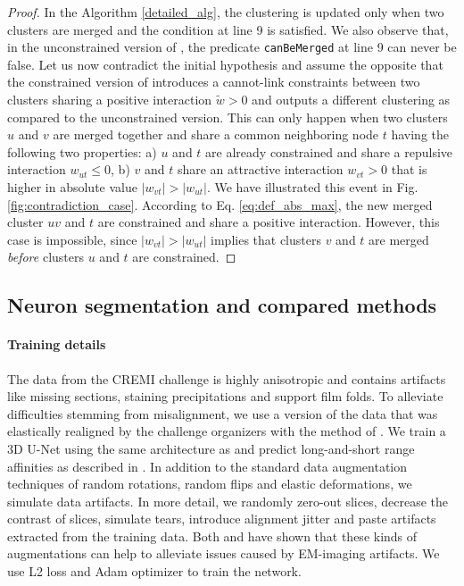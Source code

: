 \begin{proof}
In the \algname{} Algorithm \ref{detailed_alg}, the clustering is updated only when two clusters are merged and the condition at line 9 is satisfied. 
We also observe that, in the unconstrained version of \algname{}, the predicate \texttt{canBeMerged} at line 9 can never be false.
Let us now contradict the initial hypothesis and assume the opposite that the constrained version of \algname{} introduces a cannot-link constraints between two clusters sharing a positive interaction $\tilde{w}>0$ and outputs a different clustering as compared to the unconstrained version. 
This can only happen when two clusters $u$ and $v$ are merged together and share a common neighboring node $t$ having the following two properties: a) $u$ and $t$ are already constrained and share a repulsive interaction $w_{ut}\leq0$, b) $v$ and $t$ share an attractive interaction $w_{vt}>0$ that is higher in absolute value $|w_{vt}|>|w_{ut}|$. We have illustrated this event in Fig. \ref{fig:contradiction_case}. 
According to Eq. \ref{eq:def_abs_max}, the new merged cluster $uv$ and $t$ are constrained and share a positive interaction. 
However, this case is impossible, since $|w_{vt}|>|w_{ut}|$ implies that clusters $v$ and $t$ are merged \emph{before} clusters $u$ and $t$ are constrained. 
\end{proof}

\subsection{Neuron segmentation and compared methods}\label{sec:cremi_details}
\paragraph{Training details} The data from the CREMI challenge is highly anisotropic and contains artifacts like missing sections, staining precipitations and support film folds. 
To alleviate difficulties stemming from misalignment, we use a version of the data that was elastically realigned by the challenge organizers with the method of \cite{saalfeld2012elastic}.
We train a 3D U-Net \cite{ronneberger2015u, cciccek20163d} using the same architecture as \cite{funke2018large} and predict long-and-short range affinities 
as described in \cite{lee2017superhuman}. In addition to the standard data augmentation techniques of random rotations, random flips and  elastic deformations, we simulate data artifacts.
In more detail, we randomly zero-out slices, decrease the contrast of slices, simulate tears, introduce alignment jitter and paste artifacts extracted from the training data. Both \cite{funke2018large} and \cite{lee2017superhuman} have shown
that these kinds of augmentations can help to alleviate issues caused by EM-imaging artifacts.
We use L2 loss and Adam optimizer to train the network. 

